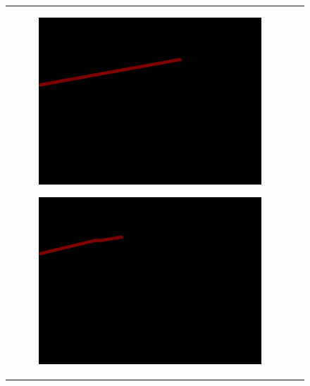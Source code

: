 \documentclass[cn,12pt,color=mine,scheme=chinese,bibstyle=gb7714-2015]{elegantbook}
\begin{document}
\begin{figure}[!htp]
\begin{tabular}{cc}
\begin{subfigure}[b]{0.23\linewidth}
			\caption{\label{lane:a}}
		\end{subfigure}
		\begin{subfigure}[b]{0.23\linewidth}
			\centering\includegraphics[width=\linewidth]{lane/train2gt}\caption{\label{lane:b}}
		\end{subfigure}
		\begin{subfigure}[b]{0.23\linewidth}
			\centering\includegraphics[width=\linewidth]{lane/train3gt}\caption{\label{lane:c}}
		\end{subfigure}
		\begin{subfigure}[b]{0.23\linewidth}

\end{subfigure}
\end{tabular}
\end{figure}
\end{document}

